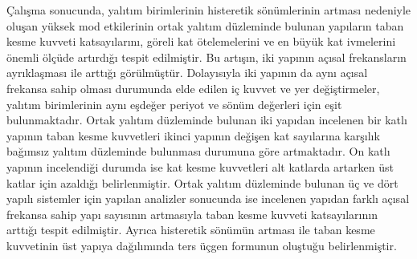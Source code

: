 Çalışma sonucunda, yalıtım birimlerinin histeretik sönümlerinin artması
nedeniyle oluşan yüksek mod etkilerinin ortak yalıtım düzleminde bulunan
yapıların taban kesme kuvveti katsayılarını, göreli kat ötelemelerini
ve en büyük kat ivmelerini önemli ölçüde artırdığı tespit edilmiştir.
Bu artışın, iki yapının açısal frekansların ayrıklaşması ile arttığı
görülmüştür. Dolayısıyla iki yapının da aynı açısal frekansa sahip
olması durumunda elde edilen iç kuvvet ve yer değiştirmeler, yalıtım
birimlerinin aynı eşdeğer periyot ve sönüm değerleri için eşit bulunmaktadır.
Ortak yalıtım düzleminde bulunan iki yapıdan incelenen bir katlı yapının
taban kesme kuvvetleri ikinci yapının değişen kat sayılarına karşılık
bağımsız yalıtım düzleminde bulunması durumuna göre artmaktadır. On
katlı yapının incelendiği durumda ise kat kesme kuvvetleri alt katlarda
artarken üst katlar için azaldığı belirlenmiştir. Ortak yalıtım düzleminde
bulunan üç ve dört yapılı sistemler için yapılan analizler sonucunda
ise incelenen yapıdan farklı açısal frekansa sahip yapı sayısının
artmasıyla taban kesme kuvveti katsayılarının arttığı tespit edilmiştir.
Ayrıca histeretik sönümün artması ile taban kesme kuvvetinin üst yapıya
dağılımında ters üçgen formunun oluştuğu belirlenmiştir.
